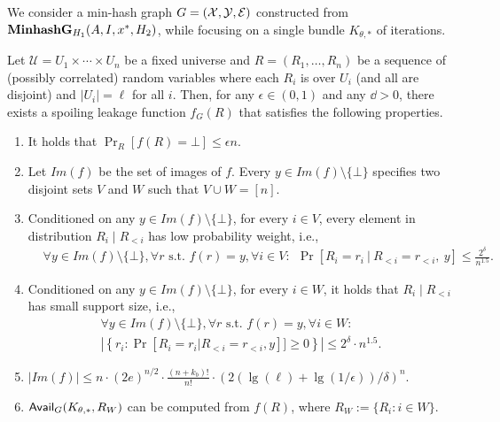 \begin{theorem} \label{thm:chain_leak_2}  We consider a min-hash graph $G = (\mathcal{X}, \mathcal{Y}, \mathcal{E})$ constructed from 
 ${\bf MinhashG}_{H_1}(A, I, {x^*}, H_2)$, while focusing on a single bundle $K_{\theta,*}$ of iterations.

Let $\mathcal{U} = U_1 \times \cdots \times U_n$ be a fixed universe
and $R = (R_1,\dots,R_n)$ be a sequence of (possibly correlated) random variables where each $R_i$ is over $U_i$ (and all are disjoint) and $|U_i| = \ell$ for all $i$.
Then, for any $\epsilon \in (0, 1)$ 
and any $\dd > 0$, 
there exists a spoiling 
leakage function $f_G(R)$ that satisfies the following properties. 
\begin{enumerate}

    \item It holds that $\Pr_{R}[f(R) = \bot] \leq \epsilon n$.
    \item 
    Let $Im(f)$ be the set of images of $f$. 
    Every $y \in Im(f) \setminus \{\bot\}$ specifies two disjoint sets $V$ and $W$ such that $V \cup W = [n]$.
    
    \item 
    Conditioned on any $y \in Im(f) \setminus \{\bot\}$, 
    for every $i \in V$, every element in distribution $R_i \mid R_{<i}$ has low probability weight, i.e.,
    \begin{align*}
    &\forall y \in Im(f) \setminus \{\bot\}, \forall r \mbox{ s.t. } f(r) = y, \forall i \in V: ~~
    \Pr\left[R_i = r_i~ \Bigg |~R_{<i} = r_{<i},~ y\right]
    \leq  \frac{2^{\delta}}{n^{1.5}}.
    \end{align*}
    \item Conditioned on any $y \in Im(f) \setminus \{\bot\}$, 
    for every $i \in W$, it holds that $R_i \mid R_{<i}$ has small support size, i.e.,
    \begin{eqnarray*}
        \forall y \in Im(f) \setminus \{\bot\}, \forall r \mbox{ s.t. } f(r) =  y, \forall i \in W: \\
        \left | \left \{ r_i : \Pr[R_i = r_i|R_{<i} = r_{<i}, y]] \geq 0 \right \}  \right | \leq 2^{\delta} \cdot n^{1.5}.
    \end{eqnarray*}
    \item $|Im(f)| \leq  n \cdot (2e)^{n/2} \cdot \frac{(n+k_b)!}{n!} \cdot \left ( 2(\lg(\ell) + \lg (1/\epsilon)) /\delta \right )^{n}$.
    \item $\mathsf{Avail}_G(K_{\theta,*}, R_W)$  can be computed from $f(R)$, where $R_W := \{R_i : i \in W\}$.
\end{enumerate}
\end{theorem}

